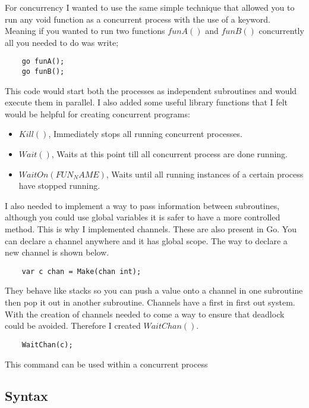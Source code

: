 For concurrency I wanted to use the same simple technique that allowed you to run any void function as a concurrent process with the use of a keyword. Meaning if you wanted to run two functions $funA()$ and $funB()$ concurrently all you needed to do was write;

\begin{lstlisting}
	go funA();
	go funB();	
\end{lstlisting}

This code would start both the processes as independent subroutines and would execute them in parallel. I also added some useful library functions that I felt would be helpful for creating concurrent programs:

\begin{itemize}
\item $Kill()$, Immediately stops all running concurrent processes.
\item $Wait()$, Waits at this point till all concurrent process are done running.
\item $WaitOn(FUN_NAME)$, Waits until all running instances of a certain process have stopped running.
\end{itemize} 

I also needed to implement a way to pass information between subroutines, although you could use global variables it is safer to have a more controlled method. This is why I implemented channels. These are also present in Go. You can declare a channel anywhere and it has global scope. The way to declare a new channel is shown below.

\begin{lstlisting}
	var c chan = Make(chan int);	
\end{lstlisting}

They behave like stacks so you can push a value onto a channel in one subroutine then pop it out in another subroutine. Channels have a first in first out system. With the creation of channels needed to come a way to ensure that deadlock could be avoided. Therefore I created $WaitChan()$.

\begin{lstlisting}
	WaitChan(c);
\end{lstlisting}

This command can be used within a concurrent process 

\subsection{Syntax}

